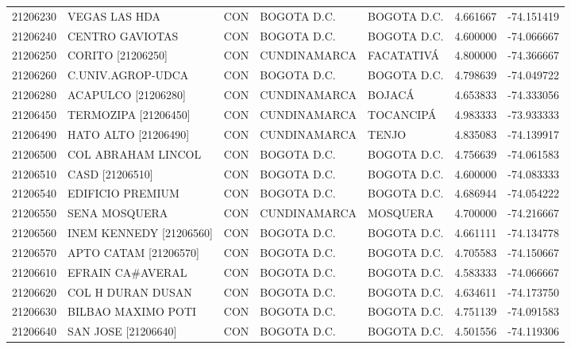 \begin{longtable}{rllllrr}
 21206230 &               VEGAS LAS HDA &  CON &      BOGOTA D.C. &       BOGOTA D.C. &  4.661667 & -74.151419 \\
 21206240 &             CENTRO GAVIOTAS &  CON &      BOGOTA D.C. &       BOGOTA D.C. &  4.600000 & -74.066667 \\
 21206250 &           CORITO [21206250] &  CON &     CUNDINAMARCA &        FACATATIVÁ &  4.800000 & -74.366667 \\
 21206260 &           C.UNIV.AGROP-UDCA &  CON &      BOGOTA D.C. &       BOGOTA D.C. &  4.798639 & -74.049722 \\
 21206280 &         ACAPULCO [21206280] &  CON &     CUNDINAMARCA &            BOJACÁ &  4.653833 & -74.333056 \\
 21206450 &        TERMOZIPA [21206450] &  CON &     CUNDINAMARCA &         TOCANCIPÁ &  4.983333 & -73.933333 \\
 21206490 &        HATO ALTO [21206490] &  CON &     CUNDINAMARCA &             TENJO &  4.835083 & -74.139917 \\
 21206500 &          COL ABRAHAM LINCOL &  CON &      BOGOTA D.C. &       BOGOTA D.C. &  4.756639 & -74.061583 \\
 21206510 &             CASD [21206510] &  CON &      BOGOTA D.C. &       BOGOTA D.C. &  4.600000 & -74.083333 \\
 21206540 &            EDIFICIO PREMIUM &  CON &      BOGOTA D.C. &       BOGOTA D.C. &  4.686944 & -74.054222 \\
 21206550 &               SENA MOSQUERA &  CON &     CUNDINAMARCA &          MOSQUERA &  4.700000 & -74.216667 \\
 21206560 &     INEM KENNEDY [21206560] &  CON &      BOGOTA D.C. &       BOGOTA D.C. &  4.661111 & -74.134778 \\
 21206570 &       APTO CATAM [21206570] &  CON &      BOGOTA D.C. &       BOGOTA D.C. &  4.705583 & -74.150667 \\
 21206610 &            EFRAIN CA\#AVERAL &  CON &      BOGOTA D.C. &       BOGOTA D.C. &  4.583333 & -74.066667 \\
 21206620 &           COL H DURAN DUSAN &  CON &      BOGOTA D.C. &       BOGOTA D.C. &  4.634611 & -74.173750 \\
 21206630 &          BILBAO MAXIMO POTI &  CON &      BOGOTA D.C. &       BOGOTA D.C. &  4.751139 & -74.091583 \\
 21206640 &         SAN JOSE [21206640] &  CON &      BOGOTA D.C. &       BOGOTA D.C. &  4.501556 & -74.119306 \\

\end{longtable}

